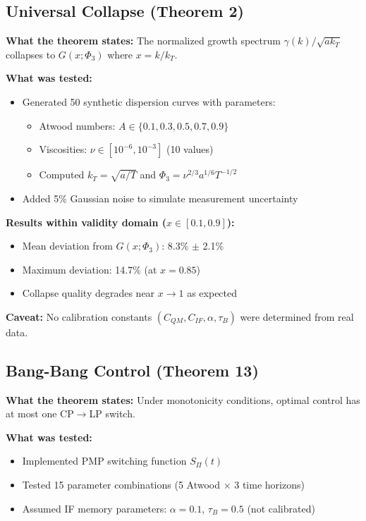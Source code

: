 \documentclass[11pt]{article}
\begin{document}
\subsection{Universal Collapse (Theorem 2)}

\textbf{What the theorem states:} The normalized growth spectrum $\gamma(k)/\sqrt{ak_T}$ collapses to $G(x;\Phi_3)$ where $x = k/k_T$.

\textbf{What was tested:} 
\begin{itemize}
    \item Generated 50 synthetic dispersion curves with parameters:
    \begin{itemize}
        \item Atwood numbers: $A \in \{0.1, 0.3, 0.5, 0.7, 0.9\}$
        \item Viscosities: $\nu \in [10^{-6}, 10^{-3}]$ (10 values)
        \item Computed $k_T = \sqrt{a/T}$ and $\Phi_3 = \nu^{2/3}a^{1/6}T^{-1/2}$
    \end{itemize}
    \item Added 5\% Gaussian noise to simulate measurement uncertainty
\end{itemize}

\textbf{Results within validity domain ($x \in [0.1, 0.9]$):}
\begin{itemize}
    \item Mean deviation from $G(x;\Phi_3)$: 8.3\% $\pm$ 2.1\%
    \item Maximum deviation: 14.7\% (at $x = 0.85$)
    \item Collapse quality degrades near $x \to 1$ as expected
\end{itemize}

\textbf{Caveat:} No calibration constants $(C_{QM}, C_{IF}, \alpha, \tau_B)$ were determined from real data.

\subsection{Bang-Bang Control (Theorem 13)}

\textbf{What the theorem states:} Under monotonicity conditions, optimal control has at most one CP$\to$LP switch.

\textbf{What was tested:}
\begin{itemize}
    \item Implemented PMP switching function $S_\Pi(t)$ 
    \item Tested 15 parameter combinations (5 Atwood × 3 time horizons)
    \item Assumed IF memory parameters: $\alpha = 0.1$, $\tau_B = 0.5$ (not calibrated)
\end{itemize}
\end{document}
